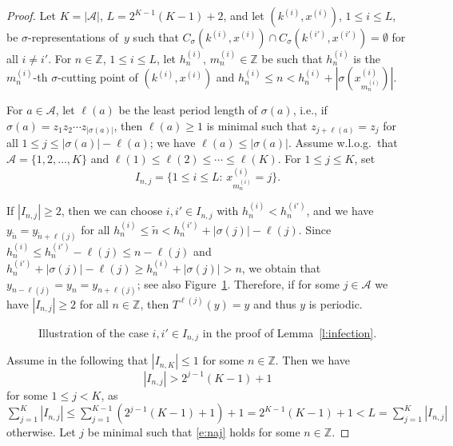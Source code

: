 \documentclass{amsart}
\theoremstyle{definition}
\theoremstyle{remark}
\numberwithin{equation}{section}
\begin{document}
\begin{proof}
Let $K = |\mathcal{A}|$, $L = 2^{K-1} (K-1) + 2$, and let $(k^{(i)}, x^{(i)})$, $1 \le i \le L$, be $\sigma$-representations of~$y$ such that $C_\sigma(k^{(i)}, x^{(i)}) \cap C_\sigma(k^{(i')}, x^{(i')}) = \emptyset$ for all $i \ne i'$. 
For $n \in \mathbb{Z}$, $1 \le i \le L$, let $h_n^{(i)},\, m_n^{(i)} \in \mathbb{Z}$ be such that $h_n^{(i)}$ is the $m_n^{(i)}$-th $\sigma$-cutting point of $(k^{(i)}, x^{(i)})$ and $h_n^{(i)} \le n < h_n^{(i)} + |\sigma(x^{(i)}_{m_n^{(i)}})|$.

For $a \in \mathcal{A}$, let $\ell(a)$ be the least period length of $\sigma(a)$, i.e., if $\sigma(a) = z_1 z_2 \cdots z_{|\sigma(a)|}$, then $\ell(a) \ge 1$ is minimal such that $z_{j+\ell(a)} = z_j$ for all $1 \le j \le |\sigma(a)|-\ell(a)$; we have $\ell(a) \le |\sigma(a)|$.
Assume w.l.o.g.\ that $\mathcal{A} = \{1,2,\ldots,K\}$ and $\ell(1) \le \ell(2) \le \cdots \le \ell(K)$.
For $1 \le j \le K$, set
\[
I_{n,j} = \{1 \le i \le L:\, x^{(i)}_{m_n^{(i)}} = j\}.
\]

If $|I_{n,j}| \ge 2$, then we can choose $i, i' \in I_{n,j}$ with $h_n^{(i)} < h_n^{(i')}$, and we have $y_{\tilde{n}} = y_{\tilde{n}+\ell(j)}$ for all $h_n^{(i)} \le \tilde{n} < h_n^{(i')} + |\sigma(j)| - \ell(j)$.
Since $h_n^{(i)} \le h_n^{(i')} - \ell(j) \le n-\ell(j)$ and $h_n^{(i')} + |\sigma(j)| - \ell(j) \ge h_n^{(i)} + |\sigma(j)| > n$, we obtain that $y_{n-\ell(j)} = y_n = y_{n+\ell(j)}$; see also Figure~\ref{f:infection}.
Therefore, if for some $j \in \mathcal{A}$ we have $|I_{n,j}| \ge 2$ for all $n \in \mathbb{Z}$, then $T^{\ell(j)}(y) = y$ and thus $y$ is periodic. 

\begin{figure}[ht]
\caption{Illustration of the case $i, i' \in I_{n,j}$ in the proof of Lemma~\ref{l:infection}.} \label{f:infection}
\end{figure}


Assume in the following that $|I_{n,K}| \le 1$ for some $n \in \mathbb{Z}$. 
Then we have 
\begin{equation} \label{e:naj}
|I_{n,j}| > 2^{j-1} (K-1) + 1
\end{equation}
for some $1 \le j < K$, as $\sum_{j=1}^K |I_{n,j}| \le \sum_{j=1}^{K-1} (2^{j-1} (K-1) + 1) + 1 = 2^{K-1} (K-1) + 1 < L = \sum_{j=1}^K |I_{n,j}|$ otherwise. 
Let $j$ be minimal such that \eqref{e:naj} holds for some $n \in \mathbb{Z}$.


\end{proof}
\end{document}
